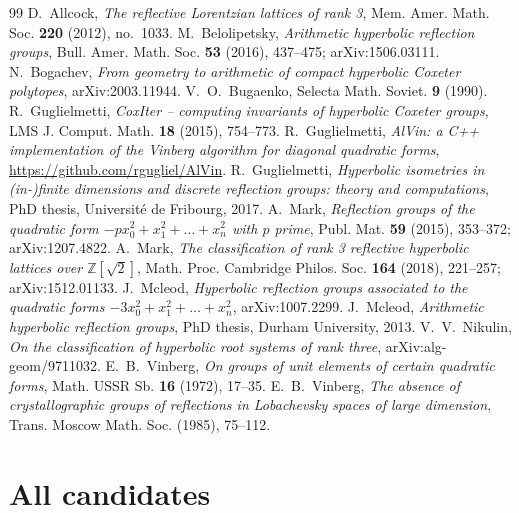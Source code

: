 \documentclass[11pt]{amsart}
\theoremstyle{definition}
\newcommand{\Z}{\mathbb{Z}}
\begin{document}
\begin{thebibliography}{99}
 D.~Allcock, \emph{The reflective Lorentzian lattices of rank 3},
  Mem. Amer. Math. Soc. \textbf{220} (2012), no.~1033.
 M.~Belolipetsky, \emph{Arithmetic hyperbolic reflection groups},
  Bull. Amer. Math. Soc. \textbf{53} (2016), 437--475; arXiv:1506.03111.
 N.~Bogachev, \emph{From geometry to arithmetic of compact hyperbolic Coxeter
  polytopes}, arXiv:2003.11944.
 V.~O.~Bugaenko, %
  Selecta Math. Soviet. \textbf{9} (1990).
 R.~Guglielmetti, \emph{CoxIter -- computing invariants of hyperbolic Coxeter
  groups}, LMS J. Comput. Math. \textbf{18} (2015), 754--773.
 R.~Guglielmetti, \emph{AlVin: a C++ implementation of the Vinberg algorithm
  for diagonal quadratic forms}, \url{https://github.com/rgugliel/AlVin}.
 R.~Guglielmetti, \emph{Hyperbolic isometries in (in-)finite dimensions and
  discrete reflection groups: theory and computations}, PhD thesis, Universit\'e de
  Fribourg, 2017. %
 A.~Mark, \emph{Reflection groups of the quadratic form
  $-px_0^2+x_1^2+\dots+x_n^2$ with $p$ prime}, Publ. Mat. \textbf{59} (2015), 353--372;
  arXiv:1207.4822.
 A.~Mark, \emph{The classification of rank 3 reflective hyperbolic lattices
  over $\Z[\sqrt2]$}, Math. Proc. Cambridge Philos. Soc. \textbf{164} (2018), 221--257;
  arXiv:1512.01133.
 J.~Mcleod, \emph{Hyperbolic reflection groups associated to the quadratic
  forms $-3x_0^2+x_1^2+\dots+x_n^2$}, arXiv:1007.2299. %
 J.~Mcleod, \emph{Arithmetic hyperbolic reflection groups}, PhD thesis,
  Durham University, 2013. %
 V.~V.~Nikulin, \emph{On the classification of hyperbolic root systems of
  rank three}, arXiv:alg-geom/9711032.
 E.~B.~Vinberg, \emph{On groups of unit elements of certain quadratic forms},
  Math. USSR Sb. \textbf{16} (1972), 17--35.
 E.~B.~Vinberg, \emph{The absence of crystallographic groups of reflections in
  Lobachevsky spaces of large dimension}, Trans. Moscow Math. Soc. (1985), 75--112.
\end{thebibliography}

\appendix
\section{All candidates}\label{app:candidates}
\end{document}
